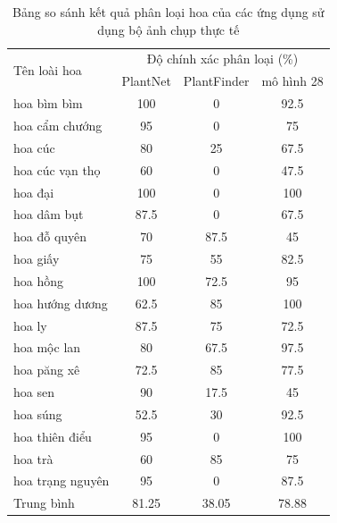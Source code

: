 \documentclass[12pt]{report}
\begin{document}
		\begin{table}
			\centering
			\caption{Bảng so sánh kết quả phân loại hoa của các ứng dụng sử dụng bộ ảnh chụp thực tế}
			\label{tbl:so sanh cac ung dung}
			\begin{tabular}{|l|c|c|c|}
			\hline
			\multirow{2}{*}{Tên loài hoa} & \multicolumn{3}{c|}{Độ chính xác phân loại (\%)} \\ \cline{2-4} 
						& PlantNet     & PlantFinder     & mô hình 28     \\ \hline
			hoa bìm bìm                   &   100           &  0          & 92.5           \\ \hline
			hoa cẩm chướng                &      95      &  0            & 75             \\ \hline
			hoa cúc                       &       80    &    25        & 67.5           \\ \hline
			hoa cúc vạn thọ               &        60      &  0          & 47.5           \\ \hline
			hoa đại                       &         100     &  0           & 100            \\ \hline
			hoa dâm bụt                   &         87.5   &    0          & 67.5           \\ \hline
			hoa đỗ quyên                  &         70   &    87.5        & 45             \\ \hline
			hoa giấy                      &          75    &     55         & 82.5           \\ \hline
			hoa hồng                      &          100  &       72.5       & 95             \\ \hline
			hoa hướng dương               &          62.5    &     85       & 100            \\ \hline
			hoa ly                        &         87.5   &         75   & 72.5           \\ \hline
			hoa mộc lan                   &          80    &        67.5      & 97.5           \\ \hline
			hoa păng xê                   &         72.5   &          85    & 77.5           \\ \hline 
			hoa sen                       &          90    &       17.5     & 45             \\ \hline
			hoa súng                      &          52.5    &      30        & 92.5           \\ \hline
			hoa thiên điểu                &          95   &       0      & 100            \\ \hline
			hoa trà                       &          60  &        85      & 75             \\ \hline
			hoa trạng nguyên              &          95    &     0       & 87.5           \\ \hline
			Trung bình                    &         81.25             & 38.05                  & 78.88                  \\ \hline
		\end{tabular}
		\end{table}\newpage
		
\end{document}
